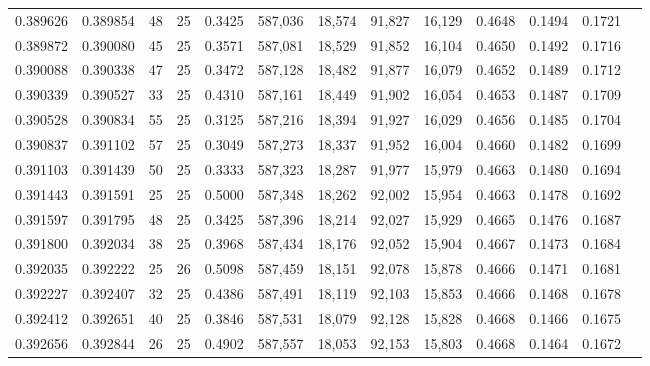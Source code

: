 \begin{tabular}{rrrrrrrrrrrrr}
0.389626 & 0.389854 &    48 &  25 &                                     0.3425 & 587,036 &  18,574 &  91,827 &  16,129 & 0.4648 & 0.1494 & 0.1721 \\
0.389872 & 0.390080 &    45 &  25 &                                     0.3571 & 587,081 &  18,529 &  91,852 &  16,104 & 0.4650 & 0.1492 & 0.1716 \\
0.390088 & 0.390338 &    47 &  25 &                                     0.3472 & 587,128 &  18,482 &  91,877 &  16,079 & 0.4652 & 0.1489 & 0.1712 \\
0.390339 & 0.390527 &    33 &  25 &                                     0.4310 & 587,161 &  18,449 &  91,902 &  16,054 & 0.4653 & 0.1487 & 0.1709 \\
0.390528 & 0.390834 &    55 &  25 &                                     0.3125 & 587,216 &  18,394 &  91,927 &  16,029 & 0.4656 & 0.1485 & 0.1704 \\
0.390837 & 0.391102 &    57 &  25 &                                     0.3049 & 587,273 &  18,337 &  91,952 &  16,004 & 0.4660 & 0.1482 & 0.1699 \\
0.391103 & 0.391439 &    50 &  25 &                                     0.3333 & 587,323 &  18,287 &  91,977 &  15,979 & 0.4663 & 0.1480 & 0.1694 \\
0.391443 & 0.391591 &    25 &  25 &                                     0.5000 & 587,348 &  18,262 &  92,002 &  15,954 & 0.4663 & 0.1478 & 0.1692 \\
0.391597 & 0.391795 &    48 &  25 &                                     0.3425 & 587,396 &  18,214 &  92,027 &  15,929 & 0.4665 & 0.1476 & 0.1687 \\
0.391800 & 0.392034 &    38 &  25 &                                     0.3968 & 587,434 &  18,176 &  92,052 &  15,904 & 0.4667 & 0.1473 & 0.1684 \\
0.392035 & 0.392222 &    25 &  26 &                                     0.5098 & 587,459 &  18,151 &  92,078 &  15,878 & 0.4666 & 0.1471 & 0.1681 \\
0.392227 & 0.392407 &    32 &  25 &                                     0.4386 & 587,491 &  18,119 &  92,103 &  15,853 & 0.4666 & 0.1468 & 0.1678 \\
0.392412 & 0.392651 &    40 &  25 &                                     0.3846 & 587,531 &  18,079 &  92,128 &  15,828 & 0.4668 & 0.1466 & 0.1675 \\
0.392656 & 0.392844 &    26 &  25 &                                     0.4902 & 587,557 &  18,053 &  92,153 &  15,803 & 0.4668 & 0.1464 & 0.1672 \\

\end{tabular}
